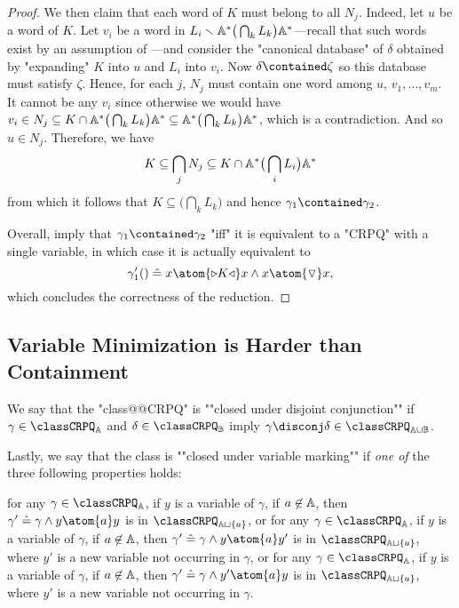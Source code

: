 \begin{proof}
	We then claim that each word of $K$ must belong to all $N_j$.
	Indeed, let $u$ be a word of $K$. Let $v_i$ be a word in
	$L_i \smallsetminus \mathbb{A}^* \big(\bigcap_k L_k\big) \mathbb{A}^*$---recall
	that such words exist by an assumption of ---and
	consider the "canonical database" of $\delta$ obtained by "expanding"
	$K$ into $u$ and $L_i$ into $v_i$.
	Now $\delta \contained \zeta$ so this database must satisfy $\zeta$.
	Hence, for each $j$, $N_j$ must contain one word among $u$, $v_1, \hdots,v_m$.
	It cannot be any $v_i$ since otherwise we would have $v_i \in N_j \subseteq
	K \cap \mathbb{A}^* \big(\bigcap_k L_k\big) \mathbb{A}^* \subseteq \mathbb{A}^* \big(\bigcap_k L_k\big) \mathbb{A}^*$, which is a contradiction. And so $u \in N_j$.
	Therefore, we have
	\[
		K \subseteq \bigcap_j N_j \subseteq K \cap \mathbb{A}^* \big(\bigcap_i L_i\big) \mathbb{A}^*
	\]
	from which it follows that $K \subseteq \big(\bigcap_k L_k\big)$ and hence
	$\gamma_1 \contained \gamma_2$.
	
	Overall,
	imply that $\gamma_1 \contained \gamma_2$ "iff" it is equivalent
	to a "CRPQ" with a single variable, in which case it is actually equivalent to
	\[\gamma'_1() \defeq x \atom{\triangleright K \triangleleft} x
		\land x \atom{\marking} x,\]
	which concludes the correctness of the reduction.
\end{proof}

\subsection{Variable Minimization is Harder than Containment}

We say that the "class@@CRPQ" is \AP""closed under disjoint conjunction""
if $\gamma \in \classCRPQ_\A$ and $\delta \in \classCRPQ_\B$
imply $\gamma \disconj \delta \in \classCRPQ_{\A \cup \B}$.

Lastly, we say that the class is \AP""closed under variable marking""
if \emph{one of} the three following properties holds: 
\begin{description}
	\itemAP[\intro*\axiomVarMarkingLoop] for any $\gamma \in \classCRPQ_{\A}$, if $y$ is a variable of $\gamma$,
		if $a\not\in\mathbb{A}$, then $\gamma' \defeq \gamma \land y \atom{a} y$
		is in $\classCRPQ_{\A\sqcup\{a\}}$, or
	\itemAP[\intro*\axiomVarMarkingOut] for any $\gamma \in \classCRPQ_{\A}$, if $y$ is a variable of $\gamma$,	
		if $a\not\in\mathbb{A}$, then $\gamma' \defeq \gamma \land y \atom{a} y'$
		is in $\classCRPQ_{\A\sqcup\{a\}}$,
		where $y'$ is a new variable not occurring in $\gamma$, or
	\itemAP[\intro*\axiomVarMarkingIn] for any $\gamma \in \classCRPQ_{\A}$, if $y$ is a variable of $\gamma$,	
		if $a\not\in\mathbb{A}$, then $\gamma' \defeq \gamma \land y' \atom{a} y$
		is in $\classCRPQ_{\A\sqcup\{a\}}$,
		where $y'$ is a new variable not occurring in $\gamma$.
\end{description}

